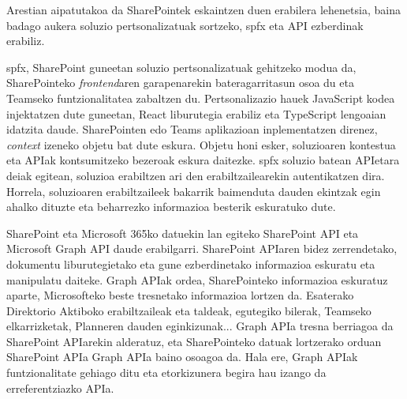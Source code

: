 Arestian aipatutakoa da SharePointek eskaintzen duen erabilera lehenetsia, baina badago aukera soluzio
pertsonalizatuak sortzeko, \acrfull{spfx} eta API ezberdinak erabiliz. 

\acrlong{spfx}, SharePoint guneetan soluzio pertsonalizatuak gehitzeko modua da, SharePointeko \textit{frontend}aren
garapenarekin bateragarritasun osoa du eta Teamseko funtzionalitatea zabaltzen du. Pertsonalizazio hauek 
JavaScript kodea injektatzen dute guneetan, React liburutegia erabiliz eta TypeScript lengoaian
idatzita daude. SharePointen edo Teams aplikazioan inplementatzen direnez, \textit{context}
izeneko objetu bat dute eskura. Objetu honi esker, soluzioaren kontestua eta APIak kontsumitzeko bezeroak
eskura daitezke. \acrshort{spfx} soluzio batean APIetara deiak egitean, soluzioa erabiltzen ari den
erabiltzailearekin autentikatzen dira. Horrela, soluzioaren erabiltzaileek bakarrik baimenduta dauden
ekintzak egin ahalko dituzte eta beharrezko informazioa besterik eskuratuko dute. 

SharePoint eta Microsoft 365ko datuekin lan egiteko SharePoint API eta Microsoft Graph API daude erabilgarri. SharePoint
APIaren bidez zerrendetako, dokumentu liburutegietako eta gune ezberdinetako informazioa eskuratu eta manipulatu daiteke.
Graph APIak ordea, SharePointeko informazioa eskuratuz aparte, Microsofteko beste tresnetako informazioa lortzen da.
Esaterako Direktorio Aktiboko erabiltzaileak eta taldeak, egutegiko bilerak, Teamseko elkarrizketak, Planneren
dauden eginkizunak... Graph APIa tresna berriagoa da SharePoint APIarekin alderatuz, eta SharePointeko datuak
lortzerako orduan SharePoint APIa Graph APIa baino osoagoa da. Hala ere, Graph APIak funtzionalitate gehiago ditu eta etorkizunera begira hau izango da erreferentziazko APIa.

